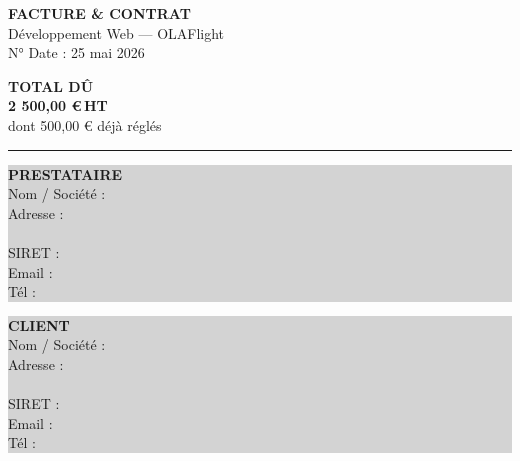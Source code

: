 \documentclass[a4paper,11pt]{article}
\newcommand{\champ}[1]{\underline{\hspace{#1}}}
\begin{document}
\begin{minipage}[t]{0.48\textwidth}
  {\LARGE\bfseries\color{primary} FACTURE \& CONTRAT}\\[2pt]
  {\large\color{accent} Développement Web — OLAFlight}\\[8pt]
  {\small\color{midgray} N° \champ{4cm} \quad Date : 25 mai 2026}
\end{minipage}
\hfill
\begin{minipage}[t]{0.48\textwidth}
  \raggedleft
  \colorbox{primary}{\parbox{0.9\textwidth}{
    \vspace{4pt}
    \centering\color{white}
    {\large\bfseries TOTAL DÛ}\\[2pt]
    {\LARGE\bfseries 2 500,00 €\,HT}\\[2pt]
    {\small dont 500,00 € déjà réglés}
    \vspace{4pt}
  }}
\end{minipage}

\vspace{12pt}
\color{midgray}\hrule\color{black}
\vspace{10pt}

\begin{minipage}[t]{0.46\textwidth}
  \colorbox{lightgray}{\parbox{\textwidth}{
    \vspace{6pt}
    \textbf{\color{primary} PRESTATAIRE}\\[4pt]
    Nom / Société : \champ{5cm}\\[3pt]
    Adresse : \champ{5.5cm}\\[3pt]
    \hspace{2.35cm} \champ{5.5cm}\\[3pt]
    SIRET : \champ{4.5cm}\\[3pt]
    Email : \champ{5cm}\\[3pt]
    Tél : \champ{4cm}
    \vspace{6pt}
  }}
\end{minipage}
\hfill
\begin{minipage}[t]{0.46\textwidth}
  \colorbox{lightgray}{\parbox{\textwidth}{
    \vspace{6pt}
    \textbf{\color{primary} CLIENT}\\[4pt]
    Nom / Société : \champ{5cm}\\[3pt]
    Adresse : \champ{5.5cm}\\[3pt]
    \hspace{2.35cm} \champ{5.5cm}\\[3pt]
    SIRET : \champ{4.5cm}\\[3pt]
    Email : \champ{5cm}\\[3pt]
    Tél : \champ{4cm}
    \vspace{6pt}
  }}
\end{minipage}
\end{document}
